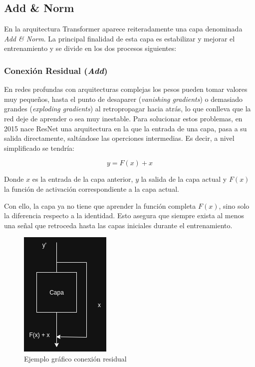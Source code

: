 \documentclass[11pt]{book}
\begin{document}
\subsection{Add \& Norm \parencite{sharma2024addnorm}} \label{subsec:addnorm}

En la arquitectura Transformer aparece reiteradamente una capa denominada \textit{Add \& Norm}. La principal finalidad de esta capa es estabilizar y mejorar el entrenamiento y se divide en los dos procesos siguientes:

\subsubsection{Conexión Residual (\textit{Add})}
En redes profundas con arquitecturas complejas los pesos pueden tomar valores muy pequeños, hasta el punto de desaparer (\textit{vanishing gradients}) o demasiado grandes (\textit{exploding gradients}) al retropropagar hacia atrás, lo que conlleva que la red deje de aprender o sea muy inestable. Para solucionar estos problemas, en 2015 nace ResNet una arquitectura en la que la entrada de una capa, pasa a su salida directamente, saltándose las operciones intermedias. Es decir, a nivel simplificado se tendría: 

\[
y = F(x) + x
\]

Donde $x$ es la entrada de la capa anterior, $y$ la salida de la capa actual y $F(x)$ la función de activación correspondiente a la capa actual.

Con ello, la capa ya no tiene que aprender la función completa $F(x)$, sino solo la diferencia respecto a la identidad. Esto asegura que siempre exista al menos una señal que retroceda hasta las capas iniciales durante el entrenamiento.

\begin{figure}[h]
    \centering
    \includegraphics[width=0.5\linewidth]{img/ResNet.png}
    \caption{Ejemplo gráfico conexión residual}
    \label{fig:placeholder13}
\end{figure}
\end{document}
